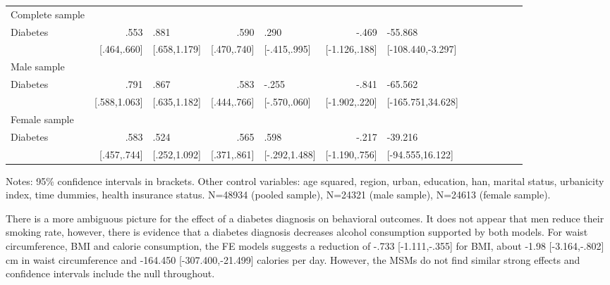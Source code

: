\begin{table}[h]
\begin{adjustbox}{max width=\textwidth, center}
\begin{threeparttable}
{\begin{tabular}{l*{6}{D{.}{.}{-1}l}}
\addlinespace             
Complete sample &&&&&&\\                
Diabetes        &       .553&            .881&            .590&            .290&           -.469&         -55.868\\
                &   [.464,.660]&    [.658,1.179]&     [.470,.740]&    [-.415,.995]&   [-1.126,.188]&[-108.440,-3.297]\\
\midrule
Male sample &&&&&&\\
Diabetes        &         .791&            .867&            .583&                -.255&           -.841&         -65.562\\
                &    [.588,1.063]&    [.635,1.182]&     [.444,.766]&   [-.570,.060]&   [-1.902,.220]&[-165.751,34.628]\\
\midrule
Female sample &&&&&&\\
Diabetes        &           .583&            .524&            .565&            .598&           -.217&         -39.216\\
                &   [.457,.744]&    [.252,1.092]&     [.371,.861]&    [-.292,1.488]&   [-1.190,.756]&[-94.555,16.122]\\                
\bottomrule
\end{tabular}
\begin{tablenotes}
\item Notes: 95\% confidence intervals in brackets. Other control variables: age squared, region, urban, education, han, marital status, urbanicity index, time dummies, health insurance status.  N=48934 (pooled sample), N=24321 (male sample), N=24613 (female sample).
\end{tablenotes}
}
\end{threeparttable}
\end{adjustbox}

\end{table}

There is a more ambiguous picture for the effect of a diabetes diagnosis on behavioral outcomes. It does not appear that men reduce their smoking rate, however, there is evidence that a diabetes diagnosis decreases alcohol consumption supported by both models. For waist circumference, \ac{BMI} and calorie consumption, the \ac{FE} models suggests a reduction of -.733 [-1.111,-.355] for \ac{BMI}, about -1.98 [-3.164,-.802] cm in waist circumference and -164.450 [-307.400,-21.499] calories per day. However, the \acp{MSM} do not find similar strong effects and confidence intervals include the null throughout.

